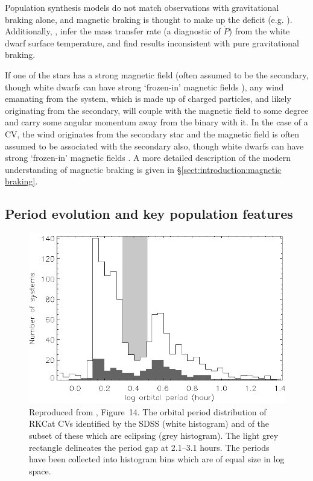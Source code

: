 Population synthesis models do not match observations with gravitational braking alone, and magnetic braking is thought to make up the deficit (e.g. \citet{kolb1993a, kolb1993, Davis2008, garraffo2018}).
Additionally, \citet{Townsley2009}, \citet{Pala2021} infer the mass transfer rate (a diagnostic of $\dot P$) from the white dwarf surface temperature, and find results inconsistent with pure gravitational braking.

If one of the stars has a strong magnetic field (often assumed to be the secondary, though white dwarfs can have strong `frozen-in' magnetic fields \citep{TOUT2011}), any wind emanating from the system, which is made up of charged particles, and likely originating from the secondary, will couple with the magnetic field to some degree and carry some angular momentum away from the binary with it.
In the case of a CV, the wind originates from the secondary star and the magnetic field is often assumed to be associated with the secondary also, though white dwarfs can have strong `frozen-in' magnetic fields \citep{TOUT2011}.
A more detailed description of the modern understanding of magnetic braking is given in \S\ref{sect:introduction:magnetic braking}.



\subsection{Period evolution and key population features}
\label{sect:introduction:period distribution key features}
\begin{figure}
    \centering
    \includegraphics[width=\columnwidth]{figures/introduction/pd-rk.eps}
    \caption{Reproduced from \citet{southworth2015}, Figure~14. The orbital period distribution of RKCat \citep{RKCat} CVs identified by the SDSS (white histogram) and of the subset of these which are eclipsing (grey histogram). The light grey rectangle delineates the period gap at 2.1–3.1 hours. The periods have been collected into histogram bins which are of equal size in log space.}
    \label{fig:period hist}
\end{figure}

